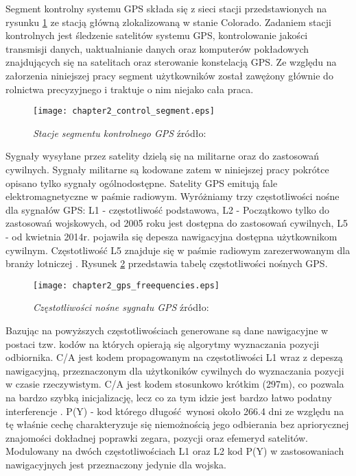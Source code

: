 \indent Segment kontrolny systemu GPS składa się z sieci stacji przedstawionych na rysunku \ref{fig:gps_control_segment} ze stacją główną zlokalizowaną w stanie Colorado.
Zadaniem stacji kontrolnych jest śledzenie satelitów systemu GPS, kontrolowanie jakości transmisji danych, uaktualnianie danych oraz komputerów pokładowych znajdujących się
na satelitach oraz sterowanie konstelacją GPS. Ze względu na załorzenia niniejszej pracy segment użytkowników został zawężony głównie do rolnictwa precyzyjnego i traktuje o
nim niejako cała praca.
\begin{figure}[H]
\centering
\texttt{[image: chapter2\_control\_segment.eps]}
\caption{\textit{Stacje segmentu kontrolnego GPS} źródło: \cite[]{GPS_GOV}}
\label{fig:gps_control_segment}
\end{figure}
\indent Sygnały wysyłane przez satelity dzielą się na militarne oraz do zastosowań cywilnych. Sygnały militarne są kodowane zatem w niniejszej pracy pokrótce opisano
tylko sygnały ogólnodostępne. Satelity GPS emitują fale elektromagnetyczne w paśmie radiowym. Wyróżniamy trzy częstotliwości nośne dla sygnałów GPS: 
L1 - częstotliwość podstawowa, L2 - Początkowo tylko do zastosowań wojskowych, od 2005 roku jest dostępna do zastosowań cywilnych, L5 - od kwietnia 2014r. pojawiła się 
depesza nawigacyjna dostępna użytkownikom cywilnym. Częstotliwość L5 znajduje się w paśmie radiowym zarezerwowanym dla branży lotniczej \cite[]{GPS_GOV}.
Rysunek \ref{fig:gps_freequencies} przedstawia tabelę częstotliwości nośnych GPS.
\begin{figure}[H]
\centering
\texttt{[image: chapter2\_gps\_freequencies.eps]}
\caption{\textit{Częstotliwości nośne sygnału GPS} źródło: \cite[][strona 329]{hofmann_gnss}}
\label{fig:gps_freequencies}
\end{figure}
\noindent Bazując na powyższych częstotliwościach generowane są dane nawigacyjne w postaci tzw. kodów na których opierają się algorytmy wyznaczania pozycji odbiornika.
C/A jest kodem propagowanym na częstotliwości L1 wraz z depeszą nawigacyjną, przeznaczonym dla użytkoników cywilnych do wyznaczania pozycji w czasie rzeczywistym.
C/A jest kodem stosunkowo krótkim (297m), co pozwala na bardzo szybką inicjalizację,
lecz co za tym idzie jest bardzo łatwo podatny interferencje \cite[][strona 332]{hofmann_gnss}.
P(Y) - kod którego długość wynosi około 266.4 dni ze względu na tę właśnie cechę charakteryzuje się niemożnością jego odbierania bez apriorycznej znajomości dokładnej 
poprawki zegara, pozycji oraz efemeryd satelitów. Modulowany na dwóch częstotliwościach L1 oraz L2 kod P(Y) w zastosowaniach nawigacyjnych jest przeznaczony jedynie dla wojska.
